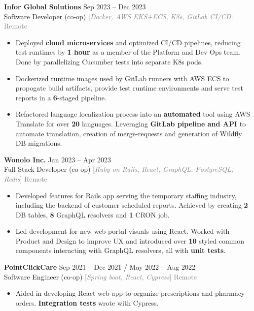 \documentclass[9pt]{developercv} %
\begin{document}
\begin{minipage}[t]{\textwidth}
	\textbf{Infor Global Solutions} \hfill Sep 2023 -- Dec 2023 \\
	Software Developer (co-op) \quad \textcolor{gray}{[\;\textit{Docker, AWS EKS+ECS, K8s, GitLab CI/CD}\;]} \hfill \textcolor{gray}{Remote}
	\begin{itemize}[noitemsep,topsep=0pt]
		\item Deployed \textbf{cloud microservices} and optimized CI/CD pipelines,
		reducing test runtimes by \textbf{1 hour} as a member of the Platform and Dev Ops team.
		Done by parallelizing Cucumber tests into separate K8s pods.
		\item Dockerized runtime images used by GitLab runners with AWS ECS to propogate build artifacts, provide test runtime
		environments and serve test reports in a \textbf{6}-staged pipeline.
		\item Refactored language localization process into an \textbf{automated} tool using
		AWS Translate for over \textbf{20} languages. Leveraging \textbf{GitLab pipeline and API}
		to automate translation, creation of merge-requests and generation of Wildfly DB migrations.
	\end{itemize}
	\vspace{0.3em}

	\textbf{Wonolo Inc.} \hfill Jan 2023 -- Apr 2023 \\
	Full Stack Developer (co-op) \quad \textcolor{gray}{[\;\textit{Ruby on Rails, React, GraphQL, PostgreSQL, Redis}\;]} \hfill \textcolor{gray}{Remote}
	\begin{itemize}[noitemsep,topsep=0pt]
		\item Developed features for Rails app serving the temporary staffing industry, including the
		backend of customer scheduled reports. Achieved by creating \textbf{2} DB tables, \textbf{8} GraphQL resolvers and \textbf{1} CRON job.
		\item Led development for new web portal visuals using React. Worked with Product and Design to improve UX and introduced over \textbf{10} styled common components interacting with GraphQL resolvers, all with \textbf{unit tests}.
	\end{itemize}
	\vspace{0.3em}

	\textbf{PointClickCare} \hfill Sep 2021 -- Dec 2021 / May 2022 -- Aug 2022 \\
	Software Engineer (co-op) \quad \textcolor{gray}{[\;\textit{Spring boot, React, Cypress}\;]} \hfill \textcolor{gray}{Remote}
	\begin{itemize}[noitemsep,topsep=0pt]
		\item Aided in developing React web app to organize prescriptions and pharmacy orders.
		\textbf{Integration tests} wrote with Cypress.
	\end{itemize}
	\vspace{0.3em}


\end{minipage}
\end{document}
